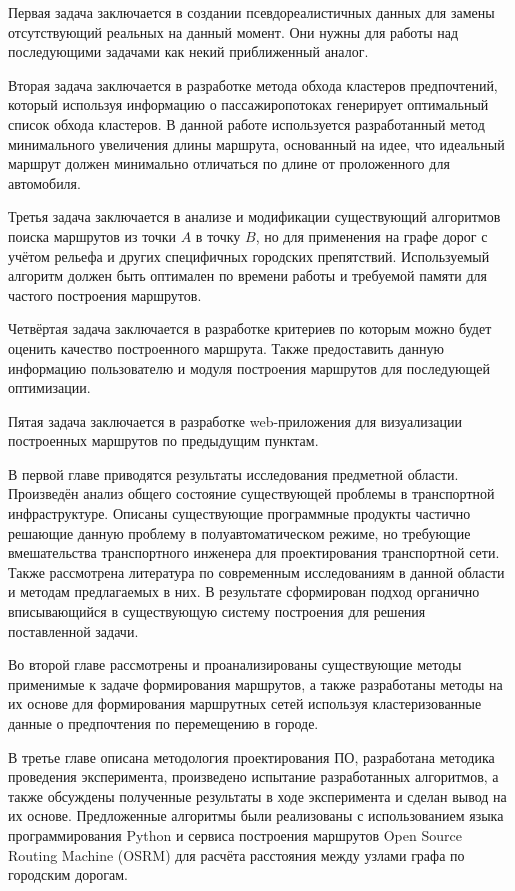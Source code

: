 Первая задача заключается в создании псевдореалистичных данных для замены отсутствующий реальных на данный 
момент. Они нужны для работы над последующими задачами как некий приближенный аналог.

Вторая задача заключается в разработке метода обхода кластеров предпочтений, который используя информацию о 
пассажиропотоках генерирует оптимальный список обхода кластеров. В данной работе используется разработанный 
метод минимального увеличения длины маршрута, основанный на идее, что идеальный маршрут должен минимально 
отличаться по длине от проложенного для автомобиля.

Третья задача заключается в анализе и модификации существующий алгоритмов поиска маршрутов из точки \( A \) 
в точку \( B \), но для применения на графе дорог с учётом рельефа и других специфичных городских 
препятствий. Используемый алгоритм должен быть оптимален по времени работы и требуемой памяти для частого 
построения маршрутов.

Четвёртая задача заключается в разработке критериев по которым можно будет оценить качество построенного 
маршрута. Также предоставить данную информацию пользователю и модуля построения маршрутов для последующей 
оптимизации.

Пятая задача заключается в разработке web-приложения для визуализации построенных маршрутов по предыдущим 
пунктам.

В первой главе приводятся результаты исследования предметной области. Произведён анализ общего состояние существующей 
проблемы в транспортной инфраструктуре. Описаны существующие программные продукты частично решающие данную проблему в 
полуавтоматическом режиме, но требующие вмешательства транспортного инженера для проектирования транспортной сети. 
Также рассмотрена литература по современным исследованиям в данной области и методам предлагаемых в них. В результате 
сформирован подход органично вписывающийся в существующую систему построения для решения поставленной задачи.

Во второй главе рассмотрены и проанализированы существующие методы применимые к задаче формирования 
маршрутов, а также разработаны методы на их основе для формирования маршрутных сетей используя 
кластеризованные данные о предпочтения по перемещению в городе.

В третье главе описана методология проектирования ПО, разработана методика проведения эксперимента, произведено 
испытание разработанных алгоритмов, а также обсуждены полученные результаты в ходе эксперимента и сделан вывод на их 
основе. Предложенные алгоритмы были реализованы с использованием языка программирования Python и сервиса построения 
маршрутов Open Source Routing Machine (OSRM) для расчёта расстояния между узлами графа по городским дорогам.

